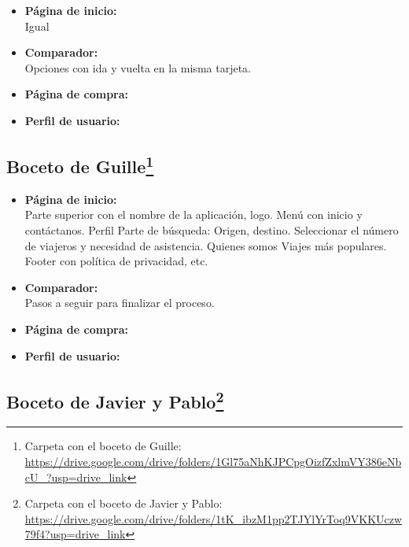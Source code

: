 \begin{itemize}
    \item\textbf{Página de inicio:} \\ Igual
    \item\textbf{Comparador:} \\ Opciones con ida y vuelta en la misma tarjeta.
    \item\textbf{Página de compra:} \\ 
    \item\textbf{Perfil de usuario:} \\ 
\end{itemize}

\subsection[Boceto de Guille]{Boceto de Guille\footnote{Carpeta con el boceto de Guille: \url{https://drive.google.com/drive/folders/1Gl75aNhKJPCpgOizfZxlmVY386eNbcU_?usp=drive_link}}}

\begin{itemize}
    \item\textbf{Página de inicio:} \\ Parte superior con el nombre de la aplicación, logo. Menú con inicio y contáctanos. Perfil
    Parte de búsqueda: Origen, destino. Seleccionar el número de viajeros y necesidad de asistencia.
    Quienes somos
    Viajes más populares.
    Footer con política de privacidad, etc.
    
    \item\textbf{Comparador:} \\ Pasos a seguir para finalizar el proceso.
    \item\textbf{Página de compra:} \\ 
    \item\textbf{Perfil de usuario:} \\ 
\end{itemize}

\subsection[Boceto de Javier y Pablo]{Boceto de Javier y Pablo\footnote{Carpeta con el boceto de Javier y Pablo: \url{https://drive.google.com/drive/folders/1tK_ibzM1pp2TJYlYrToq9VKKUczw79f4?usp=drive_link}}}

